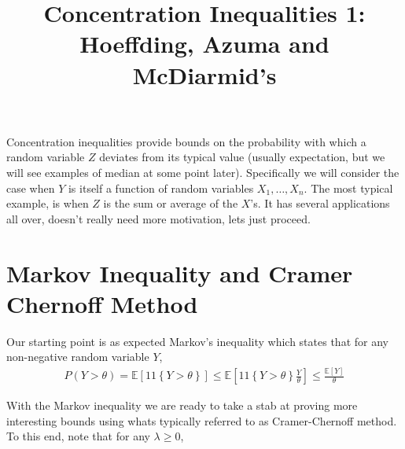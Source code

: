 \documentclass[11pt]{article}
\title{Concentration Inequalities 1: Hoeffding, Azuma and McDiarmid's}
\newcommand{\E}{\ensuremath{\mathbb{E}}}
\newcommand{\Exp}[1]{\ensuremath{\mathbb{E}}\left[#1\right]}
\newcommand{\ind}[1]{\ensuremath{1\!\!1} \left\{ #1 \right\}}
\begin{document}
\maketitle

Concentration inequalities provide bounds on the probability with which a random variable $Z$ deviates from its typical value (usually expectation, but we will see examples of median at some point later). Specifically we will consider the case when $Y$ is itself a function of random variables $X_1,\ldots,X_n$. The most typical example, is when $Z$ is the sum or average of the $X$'s.  It has several applications all over, doesn't really need more motivation, lets just proceed.

\section{Markov Inequality and Cramer Chernoff Method}
Our starting point is as expected Markov's inequality which states that for any non-negative random variable $Y$, 
\begin{align*}
P(Y > \theta) = \E[\ind{Y > \theta}] \le \Exp{\ind{Y > \theta} \frac{Y}{\theta}} \le \frac{\Exp{Y}}{\theta}
\end{align*}

With the Markov inequality we are ready to take a stab at proving more interesting bounds using whats typically referred to as Cramer-Chernoff method. To this end, note that for any $\lambda \ge 0$,
\end{document}
